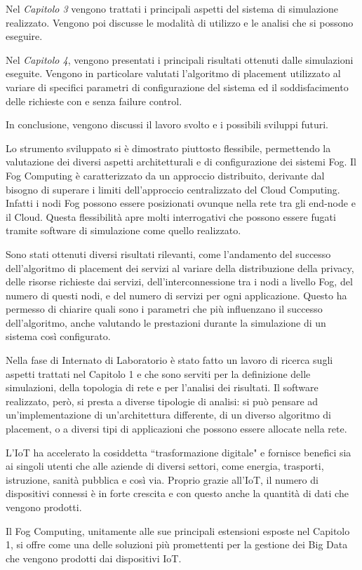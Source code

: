 \documentclass[a4paper,11pt]{article}
\begin{document}
Nel \textit{Capitolo 3} vengono trattati i principali aspetti del sistema di simulazione realizzato. Vengono poi discusse le modalità di utilizzo e le analisi che si possono eseguire.

Nel \textit{Capitolo 4}, vengono presentati i principali risultati ottenuti dalle simulazioni eseguite. Vengono in particolare valutati l'algoritmo di placement utilizzato al variare di specifici parametri di configurazione del sistema ed il soddisfacimento delle richieste con e senza failure control.

In conclusione, vengono discussi il lavoro svolto e i possibili sviluppi futuri.

Lo strumento sviluppato si è dimostrato piuttosto flessibile, permettendo la valutazione dei diversi aspetti architetturali e di configurazione dei sistemi Fog. Il Fog Computing è caratterizzato da un approccio distribuito, derivante dal bisogno di superare i limiti dell'approccio centralizzato del Cloud Computing. Infatti i nodi Fog possono essere posizionati ovunque nella rete tra gli end-node e il Cloud. Questa flessibilità apre molti interrogativi che possono essere fugati tramite software di simulazione come quello realizzato. 

Sono stati ottenuti diversi risultati rilevanti, come l'andamento del successo dell'algoritmo di placement dei servizi al variare della distribuzione della privacy, delle risorse richieste dai servizi, dell'interconnessione tra i nodi a livello Fog, del numero di questi nodi, e del numero di servizi per ogni applicazione. Questo ha permesso di chiarire quali sono i parametri che più influenzano il successo dell'algoritmo, anche valutando le prestazioni durante la simulazione di un sistema così configurato.

Nella fase di Internato di Laboratorio è stato fatto un lavoro di ricerca sugli aspetti trattati nel Capitolo 1 e che sono serviti per la definizione delle simulazioni, della topologia di rete e per l'analisi dei risultati. Il software realizzato, però, si presta a diverse tipologie di analisi: si può pensare ad un'implementazione di un'architettura differente, di un diverso algoritmo di placement, o a diversi tipi di applicazioni che possono essere allocate nella rete. 

L'IoT ha accelerato la cosiddetta ``trasformazione digitale" e fornisce benefici sia ai singoli utenti che alle aziende di diversi settori, come energia, trasporti, istruzione, sanità pubblica e così via. Proprio grazie all'IoT, il numero di dispositivi connessi è in forte crescita e con questo anche la quantità di dati che vengono prodotti.

Il Fog Computing, unitamente alle sue principali estensioni esposte nel Capitolo 1, si offre come una delle soluzioni più promettenti per la gestione dei Big Data che vengono prodotti dai dispositivi IoT.


   	
\end{document}
